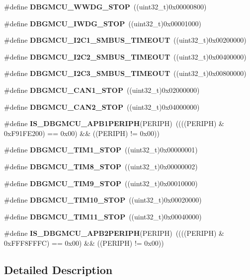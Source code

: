 \begin{DoxyCompactItemize}
\item 
\#define \textbf{ D\+B\+G\+M\+C\+U\+\_\+\+W\+W\+D\+G\+\_\+\+S\+T\+OP}~((uint32\+\_\+t)0x00000800)
\item 
\#define \textbf{ D\+B\+G\+M\+C\+U\+\_\+\+I\+W\+D\+G\+\_\+\+S\+T\+OP}~((uint32\+\_\+t)0x00001000)
\item 
\#define \textbf{ D\+B\+G\+M\+C\+U\+\_\+\+I2\+C1\+\_\+\+S\+M\+B\+U\+S\+\_\+\+T\+I\+M\+E\+O\+UT}~((uint32\+\_\+t)0x00200000)
\item 
\#define \textbf{ D\+B\+G\+M\+C\+U\+\_\+\+I2\+C2\+\_\+\+S\+M\+B\+U\+S\+\_\+\+T\+I\+M\+E\+O\+UT}~((uint32\+\_\+t)0x00400000)
\item 
\#define \textbf{ D\+B\+G\+M\+C\+U\+\_\+\+I2\+C3\+\_\+\+S\+M\+B\+U\+S\+\_\+\+T\+I\+M\+E\+O\+UT}~((uint32\+\_\+t)0x00800000)
\item 
\#define \textbf{ D\+B\+G\+M\+C\+U\+\_\+\+C\+A\+N1\+\_\+\+S\+T\+OP}~((uint32\+\_\+t)0x02000000)
\item 
\#define \textbf{ D\+B\+G\+M\+C\+U\+\_\+\+C\+A\+N2\+\_\+\+S\+T\+OP}~((uint32\+\_\+t)0x04000000)
\item 
\#define \textbf{ I\+S\+\_\+\+D\+B\+G\+M\+C\+U\+\_\+\+A\+P\+B1\+P\+E\+R\+I\+PH}(P\+E\+R\+I\+PH)~((((P\+E\+R\+I\+PH) \& 0x\+F91\+F\+E200) == 0x00) \&\& ((\+P\+E\+R\+I\+P\+H) != 0x00))
\item 
\#define \textbf{ D\+B\+G\+M\+C\+U\+\_\+\+T\+I\+M1\+\_\+\+S\+T\+OP}~((uint32\+\_\+t)0x00000001)
\item 
\#define \textbf{ D\+B\+G\+M\+C\+U\+\_\+\+T\+I\+M8\+\_\+\+S\+T\+OP}~((uint32\+\_\+t)0x00000002)
\item 
\#define \textbf{ D\+B\+G\+M\+C\+U\+\_\+\+T\+I\+M9\+\_\+\+S\+T\+OP}~((uint32\+\_\+t)0x00010000)
\item 
\#define \textbf{ D\+B\+G\+M\+C\+U\+\_\+\+T\+I\+M10\+\_\+\+S\+T\+OP}~((uint32\+\_\+t)0x00020000)
\item 
\#define \textbf{ D\+B\+G\+M\+C\+U\+\_\+\+T\+I\+M11\+\_\+\+S\+T\+OP}~((uint32\+\_\+t)0x00040000)
\item 
\#define \textbf{ I\+S\+\_\+\+D\+B\+G\+M\+C\+U\+\_\+\+A\+P\+B2\+P\+E\+R\+I\+PH}(P\+E\+R\+I\+PH)~((((P\+E\+R\+I\+PH) \& 0x\+F\+F\+F8\+F\+F\+F\+C) == 0x00) \&\& ((\+P\+E\+R\+I\+P\+H) != 0x00))
\end{DoxyCompactItemize}


\subsection{Detailed Description}


